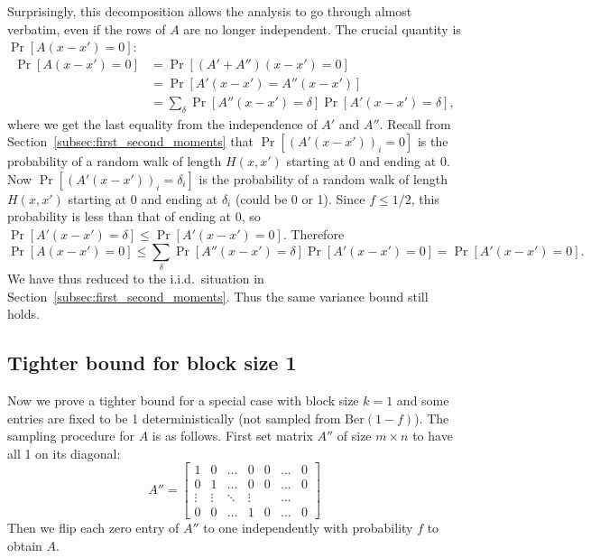 \documentclass[11pt]{article}
\begin{document}
Surprisingly, this decomposition allows the analysis to go through almost
verbatim, even if the rows of $A$ are no longer independent.
The crucial quantity is $\Pr[A(x - x') = 0]$:
\begin{align*}
  \Pr[A(x - x') = 0]
  &= \Pr[(A' + A'')(x - x') = 0] \\
  &= \Pr[A'(x - x') = A''(x - x')] \\
  &= \sum_{\delta} \Pr[A''(x - x') = \delta] \Pr[A'(x - x') = \delta],
\end{align*}
where we get the last equality from the independence of $A'$ and $A''$.
Recall from Section~\ref{subsec:first_second_moments} that $\Pr[(A'(x - x'))_i =
0]$ is the probability of a random walk of length $H(x, x')$ starting at 0 and
ending at 0.
Now $\Pr[(A'(x - x'))_i = \delta_i]$ is the probability of a random walk of length
$H(x, x')$ starting at 0 and ending at $\delta_i$ (could be 0 or 1).
Since $f \leq 1/2$, this probability is less than that of ending at 0, so $\Pr[A'(x -
x') = \delta] \leq \Pr[A'(x - x') = 0]$.
Therefore
\begin{equation*}
  \Pr[A(x - x') = 0] \leq \sum_{\delta} \Pr[A''(x - x') = \delta] \Pr[A'(x - x') = 0] = \Pr[A'(x
  - x') = 0].
\end{equation*}
We have thus reduced to the i.i.d.\ situation in Section~\ref{subsec:first_second_moments}.
Thus the same variance bound still holds.

\subsection{Tighter bound for block size 1}
\label{subsec:block_size_1}

Now we prove a tighter bound for a special case with block size $k = 1$ and some
entries are fixed to be 1 deterministically (not sampled from $\mathrm{Ber}(1 -
f)$).
The sampling procedure for $A$ is as follows.
First set matrix $A''$ of size $m \times n$ to have all 1 on its diagonal:
\begin{equation*}
  A'' = 
  \begin{bmatrix} 
    1 & 0 & \hdots & 0 & 0 & \hdots & 0 \\ 
    0 & 1 & \hdots & 0 & 0 & \hdots & 0 \\
    \vdots & \vdots & \ddots & \vdots & & \hdots & \\
    0 & 0 & \hdots & 1 & 0 & \hdots & 0
  \end{bmatrix}
\end{equation*}
Then we flip each zero entry of $A''$ to one independently with probability $f$
to obtain $A$.
\end{document}

